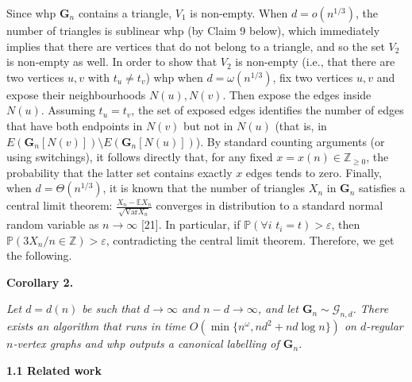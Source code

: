 \documentclass[10pt,a4paper]{article}
\begin{document}
Since whp $\mathbf{G}_{n}$ contains a triangle, $V_{1}$ is non-empty. When $d=o(n^{1/3})$, the number of triangles is sublinear whp (by Claim 9 below), which immediately implies that there are vertices that do not belong to a triangle, and so the set $V_{2}$ is non-empty as well. In order to show that $V_{2}$ is non-empty (i.e., that there are two vertices $u,v$ with $t_{u}\neq t_{v}$) whp when $d=\omega(n^{1/3})$, fix two vertices $u,v$ and expose their neighbourhoods $N(u),N(v)$. Then expose the edges inside $N(u)$. Assuming $t_{u}=t_{v}$, the set of exposed edges identifies the number of edges that have both endpoints in $N(v)$ but not in $N(u)$ (that is, in $E(\mathbf{G}_{n}[N(v)])\setminus E(\mathbf{G}_{n}[N(u)])$). By standard counting arguments (or using switchings), it follows directly that, for any fixed $x=x(n)\in\mathbb{Z}_{\geq 0}$, the probability that the latter set contains exactly $x$ edges tends to zero. Finally, when $d=\Theta(n^{1/3})$, it is known that the number of triangles $X_{n}$ in $\mathbf{G}_{n}$ satisfies a central limit theorem: $\frac{X_{n}-\mathbb{E}X_{n}}{\sqrt{\mathrm{Var}X_{n}}}$ converges in distribution to a standard normal random variable as $n\to\infty$ [21]. In particular, if $\mathbb{P}(\forall i\,\,t_{i}=t)>\varepsilon$, then $\mathbb{P}(3X_{n}/n\in\mathbb{Z})>\varepsilon$, contradicting the central limit theorem. Therefore, we get the following.\par





\par\medskip\noindent\textbf{
\textbf{Corollary 2}\textbf{.}
}\par



\emph{Let $d=d(n)$ be such that $d\to\infty$ and $n-d\to\infty$, and let $\mathbf{G}_{n}\sim\mathcal{G}_{n,d}$. There exists an algorithm that runs in time $O(\min\{n^{\omega},nd^{2}+nd\log n\})$ on $d$-regular $n$-vertex graphs and whp outputs a canonical labelling of $\mathbf{G}_{n}$.}\par






\par\medskip\noindent\textbf{
1.1 Related work}\par
\end{document}
